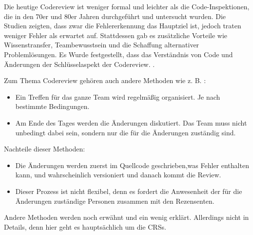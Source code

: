 
Die heutige Codereview ist weniger formal und leichter als die Code-Inspektionen, die in den 70er und 80er Jahren durchgeführt und untersucht wurden. Die Studien zeigten, dass zwar die Fehlererkennung das Hauptziel ist, jedoch traten weniger Fehler als erwartet auf. Stattdessen gab es zusätzliche Vorteile wie Wissenstransfer, Teambewusstsein und die Schaffung alternativer Problemlösungen. Es Wurde festgestellt, dass das Verständnis von Code und Änderungen der Schlüsselaspekt der Codereview. \cite{bacchelli2013expectations}.

Zum Thema Codereview gehören auch andere Methoden wie z. B. :

\begin{itemize}
	\item Ein Treffen für das ganze Team wird regelmäßig organisiert. Je nach bestimmte Bedingungen.
	\item Am Ende des Tages werden die Änderungen diskutiert. Das Team muss nicht unbedingt dabei sein, sondern nur die für die Änderungen zuständig sind.
\end{itemize} 

Nachteile dieser Methoden:
\begin{itemize}
	\item Die Änderungen werden zuerst im Quellcode geschrieben,was Fehler enthalten kann, und wahrscheinlich versioniert und danach kommt die Review.
	\item Dieser Prozess ist nicht flexibel, denn es fordert die Anwesenheit der für die Änderungen zuständige Personen zusammen mit den Rezensenten.
\end{itemize}

Andere Methoden werden noch erwähnt und ein wenig erklärt. Allerdings nicht in Details, denn hier geht es hauptsächlich um die \acp{CRS}.
